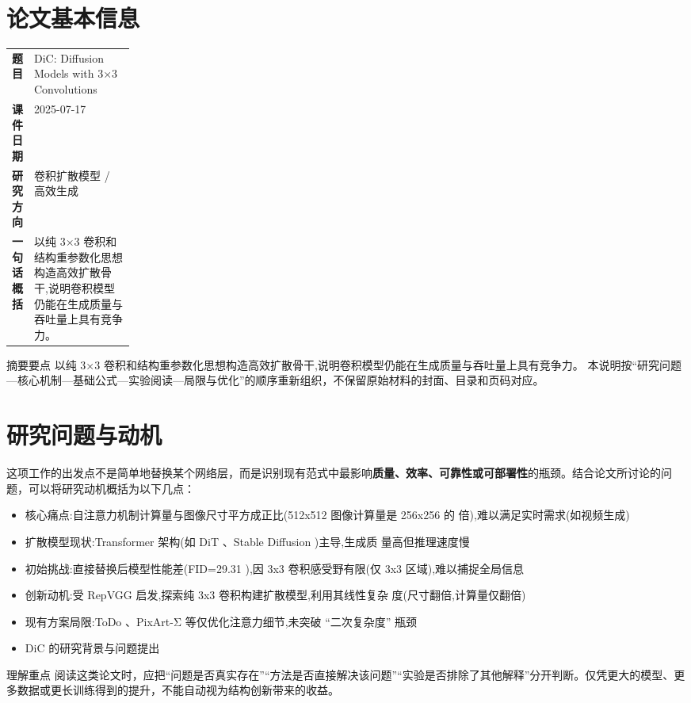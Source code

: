 \documentclass[UTF8,11pt,a4paper]{ctexart}
\newcommand{\term}[1]{\textbf{\textcolor{mainblue}{#1}}}
\begin{document}
\section{论文基本信息}
\begin{center}
\begin{tabularx}{0.94\linewidth}{>{\bfseries}p{0.18\linewidth}X}
\toprule
题目 & DiC: Diffusion Models with 3×3 Convolutions\\
课件日期 & 2025-07-17\\
研究方向 & 卷积扩散模型 / 高效生成\\
一句话概括 & 以纯 3×3 卷积和结构重参数化思想构造高效扩散骨干,说明卷积模型仍能在生成质量与吞吐量上具有竞争力。\\
\bottomrule
\end{tabularx}
\end{center}

\begin{infobox}{摘要要点}
以纯 3×3 卷积和结构重参数化思想构造高效扩散骨干,说明卷积模型仍能在生成质量与吞吐量上具有竞争力。 本说明按“研究问题—核心机制—基础公式—实验阅读—局限与优化”的顺序重新组织，不保留原始材料的封面、目录和页码对应。
\end{infobox}

\section{研究问题与动机}
这项工作的出发点不是简单地替换某个网络层，而是识别现有范式中最影响\term{质量、效率、可靠性或可部署性}的瓶颈。结合论文所讨论的问题，可以将研究动机概括为以下几点：
\begin{itemize}
\item 核心痛点:自注意力机制计算量与图像尺寸平方成正比(512x512 图像计算量是 256x256 的 倍),难以满足实时需求(如视频生成)
\item 扩散模型现状:Transformer 架构(如 DiT 、Stable Diffusion )主导,生成质 量高但推理速度慢
\item 初始挑战:直接替换后模型性能差(FID=29.31 ),因 3x3 卷积感受野有限(仅 3x3 区域),难以捕捉全局信息
\item 创新动机:受 RepVGG 启发,探索纯 3x3 卷积构建扩散模型,利用其线性复杂 度(尺寸翻倍,计算量仅翻倍)
\item 现有方案局限:ToDo 、PixArt-Σ 等仅优化注意力细节,未突破 “二次复杂度” 瓶颈
\item DiC 的研究背景与问题提出
\end{itemize}

\begin{notebox}{理解重点}
阅读这类论文时，应把“问题是否真实存在”“方法是否直接解决该问题”“实验是否排除了其他解释”分开判断。仅凭更大的模型、更多数据或更长训练得到的提升，不能自动视为结构创新带来的收益。
\end{notebox}
\end{document}
